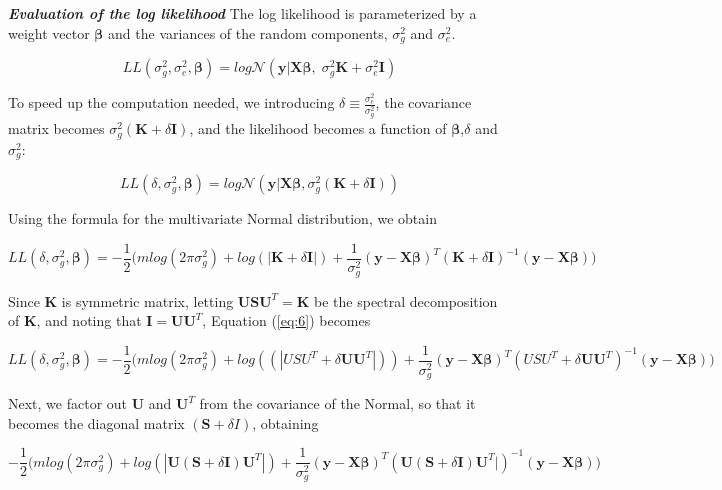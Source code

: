\documentclass[11pt]{article}
\theoremstyle{plain}
\theoremstyle{definition}
\theoremstyle{remark}
\begin{document}
\textbf{\em Evaluation of the log likelihood} The log likelihood is parameterized by a weight vector $\bm\beta$ and the variances of the random components,  $\sigma_g^2$ and $\sigma_e^2$.

\begin{equation}
\label{eq:4}
LL(\sigma_g^2,\sigma_e^2,\bm\beta)=log\mathcal{N}(\bm{y}|\bm{X\beta},\;\sigma_g^2\bm{K}+\sigma_e^2\bm{I})
\end{equation}

To speed up the computation needed, we introducing $\delta\equiv \frac{\sigma_e^2}{\sigma_g^2}$, the covariance matrix becomes $\sigma_g^2(\bm{K}+\delta{\bm{I}})$, and the likelihood becomes a function of $\bm\beta$,$\delta$ and $\sigma_g^2$:

\begin{equation}
\label{eq:5}
LL(\delta,\sigma_g^2,\bm\beta)=log\mathcal{N}(\bm{y}|\bm{X\beta},\sigma_g^2(\bm{K}+\delta{\bm{I}}))
\end{equation}

Using the formula for the multivariate Normal distribution, we obtain

\begin{equation}
\label{eq:6}
LL(\delta,\sigma_g^2,\bm\beta)=-\frac{1}{2}\Big(mlog(2\pi\sigma_g^2)+log(|\bm{K}+\delta{\bm{I}}|)+\frac{1}{\sigma_g^2}(\bm{y}-\bm{X\beta})^T(\bm{K}+\delta\bm{I})^{-1}(\bm{y}-\bm{X\beta})\Big)
\end{equation}

Since $\bm{K}$ is symmetric matrix, letting $\bm{USU}^T=\bm{K}$ be the spectral decomposition of $\bm{K}$, and noting that $\bm{I}=\bm{UU}^T$, Equation (\ref{eq:6}) becomes

\begin{equation*}
LL(\delta,\sigma_g^2,\bm\beta)=-\frac{1}{2}\Big(mlog(2\pi\sigma_g^2)+log((|USU^T+\delta\bm{UU}^T|))+\frac{1}{\sigma_g^2}(\bm{y}-\bm{X\beta})^T(USU^T+\delta\bm{UU}^T)^{-1}(\bm{y}-\bm{X\beta})\Big)
\end{equation*}

Next, we factor out $\bm{U}$ and $\bm{U}^T$ from the covariance of the Normal, so that it becomes the diagonal matrix $(\bm{S}+\delta{I})$, obtaining

\begin{equation}
\label{eq:7}
-\frac{1}{2}\Big(mlog(2\pi\sigma_g^2)+log(|\bm{U}(\bm{S}+\delta\bm{I})\bm{U}^T|)+\frac{1}{\sigma_g^2}(\bm{y}-\bm{X\beta})^T(\bm{U}(\bm{S}+\delta\bm{I})\bm{U}^T|)^{-1}(\bm{y}-\bm{X\beta})\Big)
\end{equation}
\end{document}
